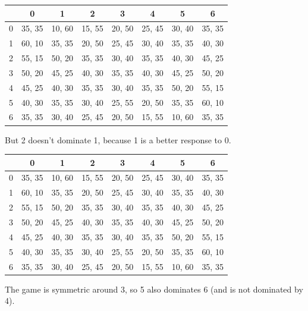 \documentclass[
  14pt,
  letterpaper,
  ignorenonframetext,
  aspectratio=169,
  handout]{beamer}
\begin{document}
\begin{frame}[plain]{}
\protect\hypertarget{section-2}{}
\begin{table}[!h]
\centering
\begin{tabular}[t]{>{}r|ccccccc}
\toprule
 & 0 & 1 & 2 & 3 & 4 & 5 & 6\\
\midrule
0 & 35, 35 & 10, 60 & 15, 55 & 20, 50 & 25, 45 & 30, 40 & 35, 35\\
1 & 60, 10 & 35, 35 & 20, 50 & 25, 45 & 30, 40 & 35, 35 & 40, 30\\
2 & 55, 15 & 50, 20 & 35, 35 & 30, 40 & 35, 35 & 40, 30 & 45, 25\\
3 & 50, 20 & 45, 25 & 40, 30 & 35, 35 & 40, 30 & 45, 25 & 50, 20\\
4 & 45, 25 & 40, 30 & 35, 35 & 30, 40 & 35, 35 & 50, 20 & 55, 15\\
5 & 40, 30 & 35, 35 & 30, 40 & 25, 55 & 20, 50 & 35, 35 & 60, 10\\
6 & 35, 35 & 30, 40 & 25, 45 & 20, 50 & 15, 55 & 10, 60 & 35, 35\\
\bottomrule
\end{tabular}
\end{table}

But 2 doesn't dominate 1, because 1 is a better response to 0.
\end{frame}

\begin{frame}[plain]{}
\protect\hypertarget{section-3}{}
\begin{table}[!h]
\centering
\begin{tabular}[t]{>{}r|ccccccc}
\toprule
 & 0 & 1 & 2 & 3 & 4 & 5 & 6\\
\midrule
0 & 35, 35 & 10, 60 & 15, 55 & 20, 50 & 25, 45 & 30, 40 & 35, 35\\
1 & 60, 10 & 35, 35 & 20, 50 & 25, 45 & 30, 40 & 35, 35 & 40, 30\\
2 & 55, 15 & 50, 20 & 35, 35 & 30, 40 & 35, 35 & 40, 30 & 45, 25\\
3 & 50, 20 & 45, 25 & 40, 30 & 35, 35 & 40, 30 & 45, 25 & 50, 20\\
4 & 45, 25 & 40, 30 & 35, 35 & 30, 40 & 35, 35 & 50, 20 & 55, 15\\
5 & 40, 30 & 35, 35 & 30, 40 & 25, 55 & 20, 50 & 35, 35 & 60, 10\\
6 & 35, 35 & 30, 40 & 25, 45 & 20, 50 & 15, 55 & 10, 60 & 35, 35\\
\bottomrule
\end{tabular}
\end{table}

The game is symmetric around 3, so 5 also dominates 6 (and is not
dominated by 4).
\end{frame}
\end{document}
